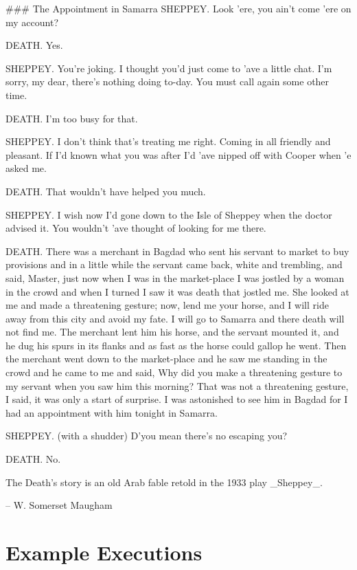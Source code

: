\documentclass{homework}
\begin{document}
\begin{sol}
  \#\#\# The Appointment in Samarra
SHEPPEY.  Look 'ere, you ain't come 'ere on my account?

DEATH.  Yes.

SHEPPEY.  You're joking. I thought you'd just come to 'ave a little
chat. I'm sorry, my dear, there's nothing doing to-day. You must call
again some other time.

DEATH.  I'm too busy for that.

SHEPPEY. I don't think that's treating me right. Coming in all
friendly and pleasant. If I'd known what you was after I'd 'ave nipped
off with Cooper when 'e asked me.

DEATH.  That wouldn't have helped you much.

SHEPPEY.  I wish now I'd gone down to the Isle of Sheppey when the
doctor advised it. You wouldn't 'ave thought of looking for me there.

DEATH.  There was a merchant in Bagdad who sent his servant to market
to buy provisions and in a little while the servant came back, white
and trembling, and said, Master, just now when I was in the
market-place I was jostled by a woman in the crowd and when I turned I
saw it was death that jostled me. She looked at me and made a
threatening gesture; now, lend me your horse, and I will ride away
from this city and avoid my fate. I will go to Samarra and there death
will not find me. The merchant lent him his horse, and the servant
mounted it, and he dug his spurs in its flanks and as fast as the
horse could gallop he went. Then the merchant went down to the
market-place and he saw me standing in the crowd and he came to me and
said, Why did you make a threatening gesture to my servant when you
saw him this morning? That was not a threatening gesture, I said, it
was only a start of surprise. I was astonished to see him in Bagdad
for I had an appointment with him tonight in Samarra.

SHEPPEY.  (with a shudder) D'you mean there's no escaping you?

DEATH.  No.

The Death's story is an old Arab fable retold in the 1933 play \_Sheppey\_.

-- W. Somerset Maugham
\end{sol}

% 

\section{Example Executions}
\end{document}

